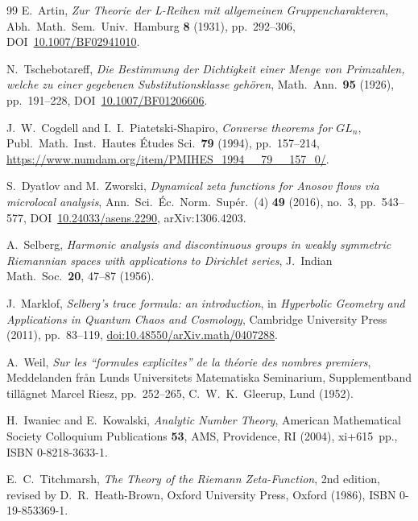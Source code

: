 \documentclass[11pt]{article}
\theoremstyle{definition}
\theoremstyle{remark}
\begin{document}
\begin{thebibliography}{99}
E.~Artin, \emph{Zur Theorie der L-Reihen mit allgemeinen
Gruppencharakteren}, Abh.\ Math.\ Sem.\ Univ.\ Hamburg \textbf{8}
(1931), pp.~292--306,
DOI~\href{https://doi.org/10.1007/BF02941010}{10.1007/BF02941010}.

N.~Tschebotareff, \emph{Die Bestimmung der Dichtigkeit einer Menge
von Primzahlen, welche zu einer gegebenen Substitutionsklasse
geh\"oren}, Math.\ Ann.\ \textbf{95} (1926), pp.~191--228,
DOI~\href{https://doi.org/10.1007/BF01206606}{10.1007/BF01206606}.

J.~W.~Cogdell and I.~I.~Piatetski-Shapiro, \emph{Converse theorems
for $GL_n$}, Publ.\ Math.\ Inst.\ Hautes \'Etudes Sci.\ \textbf{79}
(1994), pp.~157--214,
\url{https://www.numdam.org/item/PMIHES_1994__79__157_0/}.

S.~Dyatlov and M.~Zworski, \emph{Dynamical zeta functions for
Anosov flows via microlocal analysis}, Ann.\ Sci.\ \'Ec.\ Norm.\
Sup\'er.\ (4) \textbf{49} (2016), no.~3, pp.~543--577,
DOI~\href{https://doi.org/10.24033/asens.2290}{10.24033/asens.2290},
arXiv:1306.4203.

A.~Selberg, \emph{Harmonic analysis and discontinuous groups in
weakly symmetric Riemannian spaces with applications to Dirichlet
series}, J.\ Indian Math.\ Soc.\ \textbf{20}, 47--87 (1956).

J.~Marklof, \emph{Selberg's trace formula: an introduction}, in
\emph{Hyperbolic Geometry and Applications in Quantum Chaos and
Cosmology}, Cambridge University Press (2011), pp.~83--119,
\href{https://doi.org/10.48550/arXiv.math/0407288}{doi:10.48550/arXiv.math/0407288}.

A.~Weil, \emph{Sur les ``formules explicites'' de la th\'eorie des
nombres premiers}, Meddelanden fr\aa n Lunds Universitets
Matematiska Seminarium, Supplementband tillägnet Marcel Riesz,
pp.~252--265, C.~W.~K.\ Gleerup, Lund (1952).

H.~Iwaniec and E.~Kowalski, \emph{Analytic Number Theory}, American
Mathematical Society Colloquium Publications \textbf{53}, AMS,
Providence, RI (2004), xi+615~pp., ISBN 0-8218-3633-1.

E.~C.~Titchmarsh, \emph{The Theory of the Riemann Zeta-Function},
2nd edition, revised by D.~R.~Heath-Brown, Oxford University Press,
Oxford (1986), ISBN 0-19-853369-1.

\end{thebibliography}
\end{document}
